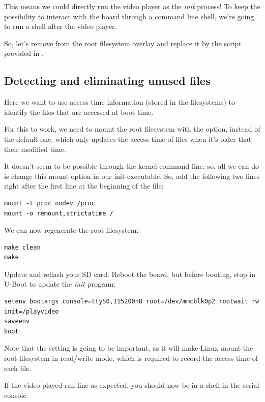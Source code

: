 This means we could directly run the video player as the {\em init}
process! To keep the possibility to interact with the board through
a command line shell, we're going to run a shell after the video player.

So, let's remove  from the root
filesystem overlay and replace it by the  script
provided in .

\subsection{Detecting and eliminating unused files}

Here we want to use access time information (stored in the filesystems)
to identify the files that are accessed at boot time.

For this to work, we need to mount the root filesystem with the
 option, instead of the default  one,
which only updates the access time of files when it's older that their
modified time.

It doesn't seem to be possible through the kernel command line, so,
all we can do is change this mount option in our init executable.
So, add the following two lines right after the first line at
the beginning of the  file:

\begin{verbatim}
mount -t proc nodev /proc
mount -o remount,strictatime /
\end{verbatim}

We can now regenerate the root filesystem:
\begin{verbatim}
make clean
make
\end{verbatim}

Update and reflash your SD card. Reboot the board, but before booting,
stop in U-Boot to update the {\em init} program:

\begin{verbatim}
setenv bootargs console=ttyS0,115200n8 root=/dev/mmcblk0p2 rootwait rw init=/playvideo
saveenv
boot
\end{verbatim}

Note that the  setting is going to be important, as it will
make Linux mount the root filesystem in read/write mode, which is
required to record the access time of each file.

If the video played ran fine as expected, you should now be in a shell
in the serial console.


